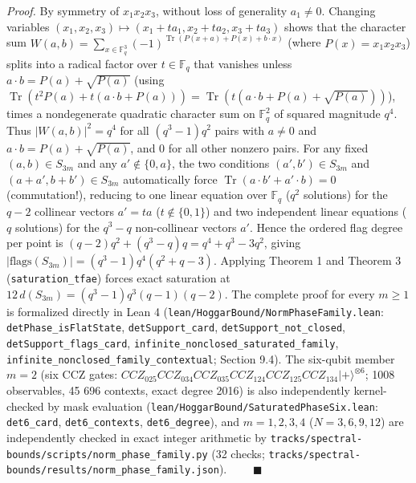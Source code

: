 \documentclass[11pt,a4paper]{article}
\begin{document}
\emph{Proof.} By symmetry of \(x_1 x_2 x_3\), without loss of generality \(a_1 \ne 0\). Changing variables
\((x_1, x_2, x_3) \mapsto (x_1 + t a_1, x_2 + t a_2, x_3 + t a_3)\) shows that the character sum
\(W(a, b) = \sum_{x \in \mathbb{F}_q^3} (-1)^{\operatorname{Tr}(P(x+a) + P(x) + b \cdot x)}\) (where
\(P(x) = x_1 x_2 x_3\)) splits into a radical factor over \(t \in \mathbb{F}_q\) that vanishes unless
\(a \cdot b = P(a) + \sqrt{P(a)}\) (using \(\operatorname{Tr}(t^2 P(a) + t(a \cdot b + P(a))) = \operatorname{Tr}(t(a \cdot b + P(a) + \sqrt{P(a)}))\)),
times a nondegenerate quadratic character sum on \(\mathbb{F}_q^2\) of squared magnitude \(q^4\). Thus
\(|W(a, b)|^2 = q^4\) for all \((q^3 - 1)q^2\) pairs with \(a \ne 0\) and \(a \cdot b = P(a) + \sqrt{P(a)}\), and
\(0\) for all other nonzero pairs. For any fixed \((a, b) \in S_{3m}\) and any \(a' \notin \{0, a\}\), the two
conditions \((a', b') \in S_{3m}\) and \((a + a', b + b') \in S_{3m}\) automatically force
\(\operatorname{Tr}(a \cdot b' + a' \cdot b) = 0\) (commutation!), reducing to one linear equation over
\(\mathbb{F}_q\) (\(q^2\) solutions) for the \(q - 2\) collinear vectors \(a' = t a\) (\(t \notin \{0, 1\}\)) and
two independent linear equations (\(q\) solutions) for the \(q^3 - q\) non-collinear vectors \(a'\). Hence the
ordered flag degree per point is \((q - 2)q^2 + (q^3 - q)q = q^4 + q^3 - 3q^2\), giving
\(|\text{flags}(S_{3m})| = (q^3 - 1)q^4(q^2 + q - 3)\). Applying Theorem 1 and Theorem 3 (\texttt{saturation\_tfae})
forces exact saturation at \(12\,d(S_{3m}) = (q^3 - 1)q^3(q - 1)(q - 2)\). The complete proof for every
\(m \ge 1\) is formalized directly in Lean 4 (\nolinkurl{lean/HoggarBound/NormPhaseFamily.lean}:
\nolinkurl{detPhase_isFlatState}, \texttt{detSupport\_card}, \nolinkurl{detSupport_not_closed}, \nolinkurl{detSupport_flags_card},
\nolinkurl{infinite_nonclosed_saturated_family}, \nolinkurl{infinite_nonclosed_family_contextual}; Section 9.4). The
six-qubit member \(m = 2\) (six CCZ gates: \(CCZ_{025} CCZ_{034} CCZ_{035} CCZ_{124} CCZ_{125} CCZ_{134} |{+}\rangle^{\otimes 6}\);
1008 observables, 45 696 contexts, exact degree 2016) is also independently kernel-checked by mask
evaluation (\nolinkurl{lean/HoggarBound/SaturatedPhaseSix.lean}: \texttt{det6\_card}, \texttt{det6\_contexts}, \texttt{det6\_degree}), and
\(m = 1, 2, 3, 4\) (\(N = 3, 6, 9, 12\)) are independently checked in exact integer arithmetic by
\nolinkurl{tracks/spectral-bounds/scripts/norm_phase_family.py} (32 checks; \nolinkurl{tracks/spectral-bounds/results/norm_phase_family.json}). \(\qquad\blacksquare\)
\end{document}
